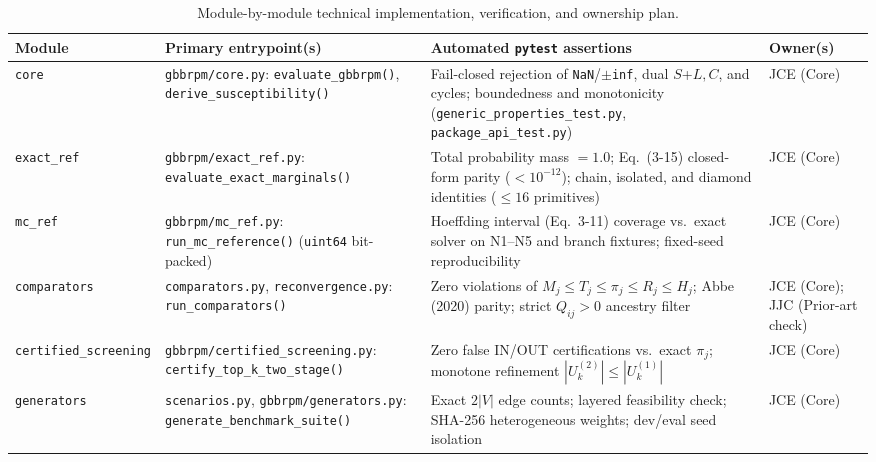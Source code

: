 \begin{table}[htbp]
\centering
\caption{Module-by-module technical implementation, verification, and ownership plan.}
\label{tab:implementation-plan}
\scriptsize
\setlength{\tabcolsep}{3.5pt}
\renewcommand{\arraystretch}{1.15}
\begin{tabularx}{\textwidth}{@{}>{\raggedright\arraybackslash}p{2.2cm} >{\raggedright\arraybackslash}p{3.2cm} L >{\raggedright\arraybackslash}p{2.1cm}@{}}
\toprule
Module & Primary entrypoint(s) & Automated \texttt{pytest} assertions & Owner(s)\\
\midrule
\texttt{core} & \texttt{gbbrpm/core.py}: \texttt{evaluate\_\allowbreak gbbrpm()}, \texttt{derive\_\allowbreak susceptibility()} & Fail-closed rejection of \texttt{NaN}/\texttt{$\pm$inf}, dual $S$+$L,C$, and cycles; boundedness and monotonicity (\texttt{generic\_\allowbreak properties\_\allowbreak test.py}, \texttt{package\_\allowbreak api\_\allowbreak test.py}) & JCE (Core)\\
\texttt{exact\_\allowbreak ref} & \texttt{gbbrpm/exact\_\allowbreak ref.py}: \texttt{evaluate\_\allowbreak exact\_\allowbreak marginals()} & Total probability mass $=1.0$; Eq.~(3-15) closed-form parity ($<10^{-12}$); chain, isolated, and diamond identities ($\le 16$ primitives) & JCE (Core)\\
\texttt{mc\_\allowbreak ref} & \texttt{gbbrpm/mc\_\allowbreak ref.py}: \texttt{run\_\allowbreak mc\_\allowbreak reference()} (\texttt{uint64} bit-packed) & Hoeffding interval (Eq.~3-11) coverage vs.\ exact solver on N1--N5 and branch fixtures; fixed-seed reproducibility & JCE (Core)\\
\texttt{comparators} & \texttt{comparators.py}, \texttt{reconvergence.py}: \texttt{run\_\allowbreak comparators()} & Zero violations of $M_j\le T_j\le\pi_j\le R_j\le H_j$; Abbe (2020) parity; strict $Q_{ij}>0$ ancestry filter & JCE (Core); JJC (Prior-art check)\\
\texttt{certified\_\allowbreak screening} & \texttt{gbbrpm/certified\_\allowbreak screening.py}: \texttt{certify\_\allowbreak top\_\allowbreak k\_\allowbreak two\_\allowbreak stage()} & Zero false IN/OUT certifications vs.\ exact $\pi_j$; monotone refinement $|U_k^{(2)}|\le|U_k^{(1)}|$ & JCE (Core)\\
\texttt{generators} & \texttt{scenarios.py}, \texttt{gbbrpm/generators.py}: \texttt{generate\_\allowbreak benchmark\_\allowbreak suite()} & Exact $2|V|$ edge counts; layered feasibility check; SHA-256 heterogeneous weights; dev/eval seed isolation & JCE (Core)\\

\end{tabularx}
\end{table}

